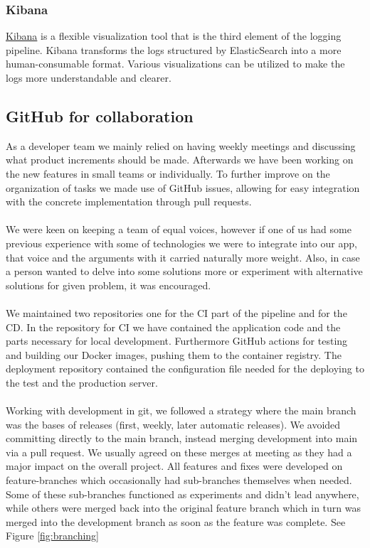 \documentclass[12pt]{article}
\begin{document}
\subsubsection{Kibana}
\href{https://www.elastic.co/kibana}{Kibana} is a flexible visualization tool that is the third element of the logging pipeline. Kibana transforms the logs structured by ElasticSearch into a more human-consumable format. Various visualizations can be utilized to make the logs more understandable and clearer.
\subsection{GitHub for collaboration}

As a developer team we mainly relied on having weekly meetings and discussing what product increments should be made. Afterwards we have been working on the new features in small teams or individually. To further improve on the organization of tasks we made use of GitHub issues, allowing for easy integration with the concrete implementation through pull requests.
\\\\
We were keen on keeping a team of equal voices, however if one of us had some previous experience with some of technologies we were to integrate into our app, that voice and the arguments with it carried naturally more weight. Also, in case a person wanted to delve into some solutions more or experiment with alternative solutions for given problem, it was encouraged. 
\\\\
We maintained two repositories one for the CI part of the pipeline and for the CD. In the repository for CI we have contained the application code and the parts necessary for local development. Furthermore GitHub actions for testing and building our Docker images, pushing them to the container registry. The deployment repository contained the configuration file needed for the deploying to the test and the production server.
\\\\
Working with development in git, we followed a strategy where the main branch was the bases of releases (first, weekly, later automatic releases). We avoided committing directly to the main branch, instead merging development into main via a pull request. We usually agreed on these merges at meeting as they had a major impact on the overall project. All features and fixes were developed on feature-branches which occasionally had sub-branches themselves when needed. Some of these sub-branches functioned as experiments and didn't lead anywhere, while others were merged back into the original feature branch which in turn was merged into the development branch as soon as the feature was complete. See Figure \ref{fig:branching}
\end{document}
